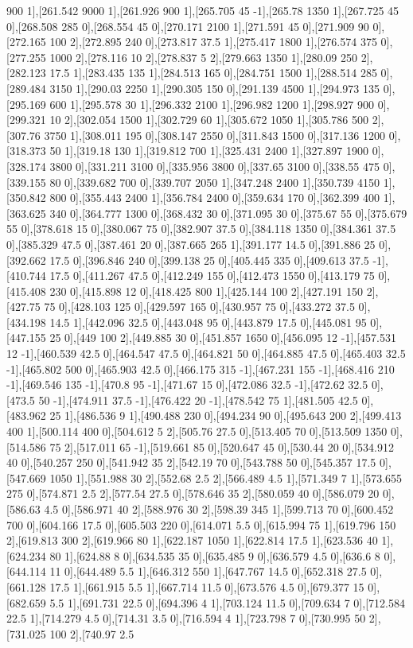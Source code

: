 {900 1],[261.542 9000 1],[261.926 900 1],[265.705 45 -1],[265.78 1350 1],[267.725 45 0],[268.508 285 0],[268.554 45 0],[270.171 2100 1],[271.591 45 0],[271.909 90 0],[272.165 100 2],[272.895 240 0],[273.817 37.5 1],[275.417 1800 1],[276.574 375 0],[277.255 1000 2],[278.116 10 2],[278.837 5 2],[279.663 1350 1],[280.09 250 2],[282.123 17.5 1],[283.435 135 1],[284.513 165 0],[284.751 1500 1],[288.514 285 0],[289.484 3150 1],[290.03 2250 1],[290.305 150 0],[291.139 4500 1],[294.973 135 0],[295.169 600 1],[295.578 30 1],[296.332 2100 1],[296.982 1200 1],[298.927 900 0],[299.321 10 2],[302.054 1500 1],[302.729 60 1],[305.672 1050 1],[305.786 500 2],[307.76 3750 1],[308.011 195 0],[308.147 2550 0],[311.843 1500 0],[317.136 1200 0],[318.373 50 1],[319.18 130 1],[319.812 700 1],[325.431 2400 1],[327.897 1900 0],[328.174 3800 0],[331.211 3100 0],[335.956 3800 0],[337.65 3100 0],[338.55 475 0],[339.155 80 0],[339.682 700 0],[339.707 2050 1],[347.248 2400 1],[350.739 4150 1],[350.842 800 0],[355.443 2400 1],[356.784 2400 0],[359.634 170 0],[362.399 400 1],[363.625 340 0],[364.777 1300 0],[368.432 30 0],[371.095 30 0],[375.67 55 0],[375.679 55 0],[378.618 15 0],[380.067 75 0],[382.907 37.5 0],[384.118 1350 0],[384.361 37.5 0],[385.329 47.5 0],[387.461 20 0],[387.665 265 1],[391.177 14.5 0],[391.886 25 0],[392.662 17.5 0],[396.846 240 0],[399.138 25 0],[405.445 335 0],[409.613 37.5 -1],[410.744 17.5 0],[411.267 47.5 0],[412.249 155 0],[412.473 1550 0],[413.179 75 0],[415.408 230 0],[415.898 12 0],[418.425 800 1],[425.144 100 2],[427.191 150 2],[427.75 75 0],[428.103 125 0],[429.597 165 0],[430.957 75 0],[433.272 37.5 0],[434.198 14.5 1],[442.096 32.5 0],[443.048 95 0],[443.879 17.5 0],[445.081 95 0],[447.155 25 0],[449 100 2],[449.885 30 0],[451.857 1650 0],[456.095 12 -1],[457.531 12 -1],[460.539 42.5 0],[464.547 47.5 0],[464.821 50 0],[464.885 47.5 0],[465.403 32.5 -1],[465.802 500 0],[465.903 42.5 0],[466.175 315 -1],[467.231 155 -1],[468.416 210 -1],[469.546 135 -1],[470.8 95 -1],[471.67 15 0],[472.086 32.5 -1],[472.62 32.5 0],[473.5 50 -1],[474.911 37.5 -1],[476.422 20 -1],[478.542 75 1],[481.505 42.5 0],[483.962 25 1],[486.536 9 1],[490.488 230 0],[494.234 90 0],[495.643 200 2],[499.413 400 1],[500.114 400 0],[504.612 5 2],[505.76 27.5 0],[513.405 70 0],[513.509 1350 0],[514.586 75 2],[517.011 65 -1],[519.661 85 0],[520.647 45 0],[530.44 20 0],[534.912 40 0],[540.257 250 0],[541.942 35 2],[542.19 70 0],[543.788 50 0],[545.357 17.5 0],[547.669 1050 1],[551.988 30 2],[552.68 2.5 2],[566.489 4.5 1],[571.349 7 1],[573.655 275 0],[574.871 2.5 2],[577.54 27.5 0],[578.646 35 2],[580.059 40 0],[586.079 20 0],[586.63 4.5 0],[586.971 40 2],[588.976 30 2],[598.39 345 1],[599.713 70 0],[600.452 700 0],[604.166 17.5 0],[605.503 220 0],[614.071 5.5 0],[615.994 75 1],[619.796 150 2],[619.813 300 2],[619.966 80 1],[622.187 1050 1],[622.814 17.5 1],[623.536 40 1],[624.234 80 1],[624.88 8 0],[634.535 35 0],[635.485 9 0],[636.579 4.5 0],[636.6 8 0],[644.114 11 0],[644.489 5.5 1],[646.312 550 1],[647.767 14.5 0],[652.318 27.5 0],[661.128 17.5 1],[661.915 5.5 1],[667.714 11.5 0],[673.576 4.5 0],[679.377 15 0],[682.659 5.5 1],[691.731 22.5 0],[694.396 4 1],[703.124 11.5 0],[709.634 7 0],[712.584 22.5 1],[714.279 4.5 0],[714.31 3.5 0],[716.594 4 1],[723.798 7 0],[730.995 50 2],[731.025 100 2],[740.97 2.5 }
